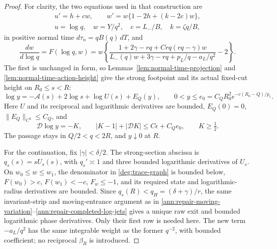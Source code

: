 \begin{proof}
For clarity, the two equations used in that construction are
\begin{equation}\label{deg:trace-normal-field}
 \begin{gathered}
 u'=h+cw,\qquad w'=w\{1-2h+(k-2c)w\},\\
 u=\log q,\quad w=Y/q^2,\quad c=L_-/B,\quad k=\zeta q/B,
 \end{gathered}
\end{equation}
in positive normal time \(d\tau_n=qB(q)\,dT\), and
\begin{equation}\label{deg:trace-graph}
 \frac{dw}{d\log q}=F(\log q,w)
 =w\left\{\frac{1+2\gamma-rq+Crq(rq-\gamma)w}
 {L_-(q)w+3\gamma-rq+p_L/q-a_L/q^2}-2\right\}.
\end{equation}
The first is unchanged in form, so
Lemmas~\ref{lem:normal-time-projection} and
\ref{lem:normal-time-action-height} give the strong footpoint and
its actual fixed-cut height on \(R_0\le s<R\):
\begin{equation}\label{deg:trace-height}
 \log y=-\mathcal A(s)+2\log s+\log U(s)+E_Q(y),\qquad
 0<y\le e_0=C_QR_0^2e^{-c(R_0-Q)/p_1}.
\end{equation}
Here \(U\) and its reciprocal and logarithmic derivatives are bounded,
\(E_Q(0)=0\), \(\|E_Q\|_{C^3}\le C_Q\), and
\begin{equation}\label{deg:trace-height-derivative}
 \mathcal D\log y=-K,\qquad
 |K-1|+|\mathcal DK|\le C\epsilon+C_Qe_0,\qquad K\ge\tfrac12.
\end{equation}
The passage stays in \(Q/2<q<2R\), and \(y\downarrow0\) at \(R\).

For the continuation, fix \(|\gamma|<\delta/2\). The strong-section
abscissa is \(q_s(s)=sU_s(s)\), with \(q_s'\asymp1\) and
three bounded logarithmic derivatives of \(U_s\). On
\(w_0\le w\le w_1\), the denominator in
\eqref{deg:trace-graph} is bounded below,
\(F(w_0)>c\), \(F(w_1)<-c\), \(F_w\le-1\), and its required
state and logarithmic-radius derivatives are bounded. Since
\(q_s(R)<q_H=(\delta+\gamma)/r\), the same invariant-strip and
moving-entrance argument as in
\eqref{ann:repair-moving-variation}--\eqref{ann:repair-completed-log-jets}
gives a unique raw exit and bounded logarithmic phase derivatives.
Only their first row is needed here. The new term
\(-a_L/q^2\) has the same integrable weight as the former \(q^{-2}\),
with bounded coefficient; no reciprocal \(\beta_R\) is introduced.


\end{proof}
